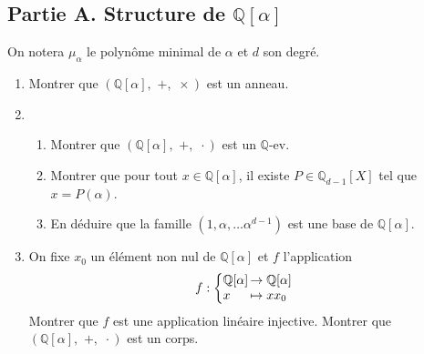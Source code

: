 \documentclass{article}
\begin{document}
	\subsection{Partie A. Structure de $\mathbb{Q}[\alpha]$}
	On notera $\mu_{\alpha}$ le polynôme minimal de $\alpha$ et $d$ son degré.
	\begin{enumerate}
		\item Montrer que $(\mathbb{Q}[\alpha],\,\, +,\,\, \times)$ est un anneau.
		\item \begin{enumerate} \item Montrer que $(\mathbb{Q}[\alpha],\,\,+,\,\, \cdot)$ est un $\mathbb{Q}$-ev.
			\item Montrer que pour tout $x\in\mathbb{Q}[\alpha]$, il existe $P\in\mathbb{Q}_{d-1}[X]$ tel que $x=P(\alpha)$.
			\item En déduire que la famille $(1,\alpha,\ldots\alpha^{d-1})$ est une base de $\mathbb{Q}[\alpha]$.
		\end{enumerate}
	\item On fixe $x_0$ un élément non nul de $\mathbb{Q}[\alpha]$ et $f$ l'application
		\begin{align*}
			f : \left\{
				\begin{array}{@{}l@{\thinspace}l}
					\mathbb{Q}[\alpha]&\to \mathbb{Q}[\alpha]\\
					x&\mapsto xx_0
				\end{array}\right.
		\end{align*}
	Montrer que $f$ est une application linéaire injective. Montrer que $(\mathbb{Q}[\alpha],\,\,+,\,\, \cdot)$ est un corps.
\end{enumerate}
\end{document}

